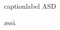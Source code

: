 \documentclass{article}
\newenvironment{JavaCode}[2]
	{\begin{XJavaCode}{#1}{#2}}
	{\end{XJavaCode}}
\begin{document}
	\begin{JavaCode}{caption}{label}
		ASD
	\end{JavaCode}
	æøå
\end{document}
